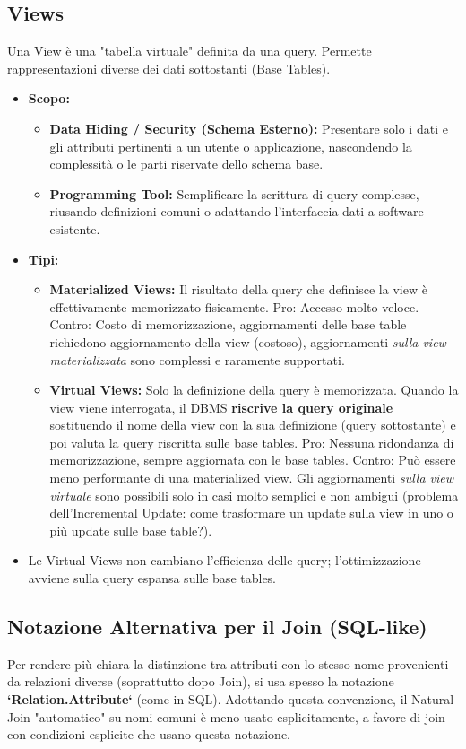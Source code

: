 \documentclass{article}
\begin{document}
	\subsection{Views}
	Una View è una "tabella virtuale" definita da una query. Permette rappresentazioni diverse dei dati sottostanti (Base Tables).
	\begin{itemize}
		\item \textbf{Scopo:}
		\begin{itemize}
			\item \textbf{Data Hiding / Security (Schema Esterno):} Presentare solo i dati e gli attributi pertinenti a un utente o applicazione, nascondendo la complessità o le parti riservate dello schema base.
			\item \textbf{Programming Tool:} Semplificare la scrittura di query complesse, riusando definizioni comuni o adattando l'interfaccia dati a software esistente.
		\end{itemize}
		\item \textbf{Tipi:}
		\begin{itemize}
			\item \textbf{Materialized Views:} Il risultato della query che definisce la view è effettivamente memorizzato fisicamente. Pro: Accesso molto veloce. Contro: Costo di memorizzazione, aggiornamenti delle base table richiedono aggiornamento della view (costoso), aggiornamenti \textit{sulla view materializzata} sono complessi e raramente supportati.
			\item \textbf{Virtual Views:} Solo la definizione della query è memorizzata. Quando la view viene interrogata, il DBMS \textbf{riscrive la query originale} sostituendo il nome della view con la sua definizione (query sottostante) e poi valuta la query riscritta sulle base tables. Pro: Nessuna ridondanza di memorizzazione, sempre aggiornata con le base tables. Contro: Può essere meno performante di una materialized view. Gli aggiornamenti \textit{sulla view virtuale} sono possibili solo in casi molto semplici e non ambigui (problema dell'Incremental Update: come trasformare un update sulla view in uno o più update sulle base table?).
		\end{itemize}
		\item Le Virtual Views non cambiano l'efficienza delle query; l'ottimizzazione avviene sulla query espansa sulle base tables.
	\end{itemize}
	
	\subsection{Notazione Alternativa per il Join (SQL-like)}
	Per rendere più chiara la distinzione tra attributi con lo stesso nome provenienti da relazioni diverse (soprattutto dopo Join), si usa spesso la notazione \textbf{`Relation.Attribute`} (come in SQL). Adottando questa convenzione, il Natural Join "automatico" su nomi comuni è meno usato esplicitamente, a favore di join con condizioni esplicite che usano questa notazione.
	
\end{document}
